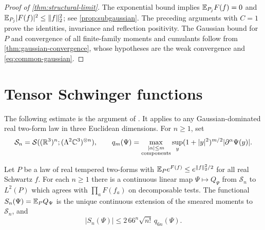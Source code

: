 \begin{proof}[Proof of \cref{thm:structural-limit}]
The exponential bound implies
\(\mathbb E_{P_j}F(f)=0\) and
\(\mathbb E_{P_j}|F(f)|^2\le\|f\|_2^2\);
see \cref{prop:subgaussian}.
The preceding arguments with \(C=1\) prove the identities,
invariance and reflection positivity.
The Gaussian bound for \(P\) and convergence of all finite-family
moments and cumulants follow from
\cref{thm:gaussian-convergence}, whose hypotheses are
the weak convergence and \eqref{eq:common-gaussian}.
\end{proof}

\section{Tensor Schwinger functions}\label{sec:tensors}
The following estimate is the argument of
\cite[Section~5.3]{QED3Manuscript}. It applies to any
Gaussian-dominated real two-form law in three Euclidean dimensions.
For \(n\ge1\), set
\[
 \mathcal S_n=\mathcal S((\mathbb R^3)^n;(\Lambda^2\mathbb C^3)^{\otimes n}),\qquad
 q_m(\Psi)=\max_{\substack{|\alpha|\le m\\\text{components}}}
 \sup_y(1+|y|^2)^{m/2}|\partial^\alpha\Psi(y)|.
\]
\begin{proposition}\label{prop:tensor-growth}
Let \(P\) be a law of real tempered two-forms with
\(\mathbb E_Pe^{F(f)}\le e^{\|f\|_2^2/2}\) for all real Schwartz \(f\).
For each \(n\ge1\) there is a continuous linear map
\(\Psi\mapsto Q_\Psi\) from \(\mathcal S_n\) to \(L^2(P)\)
which agrees with \(\prod_aF(f_a)\) on decomposable tests.
The functional \(S_n(\Psi)=\mathbb E_PQ_\Psi\) is the unique continuous
extension of the smeared moments to \(\mathcal S_n\), and
\begin{equation}\label{eq:tensor-growth}
 |S_n(\Psi)|\le2\,66^n\sqrt{n!}\,q_{6n}(\Psi).
\end{equation}
\end{proposition}

